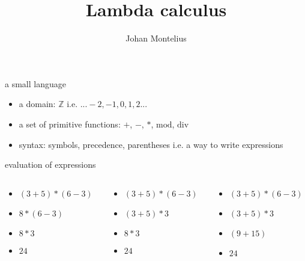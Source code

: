 


\title[ID1019 Lambda calculus]{Lambda calculus}

\author{Johan Montelius}
\date{\semester}



\begin{frame}
\titlepage
\end{frame}


\begin{frame}{a small language}

\pause

\begin{itemize}
 \item a domain: $\mathbb{Z}$ i.e. ${... -2,-1,0,1,2... }$
\pause
 \item a set of primitive functions: $+$, $-$, $*$, $\mathrm{mod}$,  $\mathrm{div}$ 
\pause
 \item syntax: symbols, precedence, parentheses i.e. a way to write expressions
\end{itemize}

\end{frame}


\begin{frame}{evaluation of expressions}
\begin{columns}
 \begin{column}{0.3\linewidth}
  \begin{itemize}
   \pause \item $(3 + 5) * (6 - 3)$
   \pause \item $8 * (6 - 3)$
   \pause \item $8 * 3$
   \pause \item $24$
  \end{itemize}   
 \end{column}
 \begin{column}{0.3\linewidth}
  \begin{itemize}
   \pause \item $(3 + 5) * (6 - 3)$
   \pause \item $(3 + 5) * 3$
   \pause \item $8 * 3$
   \pause \item $24$
  \end{itemize}   
 \end{column}
 \begin{column}{0.3\linewidth}
  \begin{itemize}
   \pause \item $(3 + 5) * (6 - 3)$
   \pause \item $(3 + 5) * 3$
   \pause \item $(9 + 15)$
   \pause \item $24$
  \end{itemize}   
 \end{column}
 \end{columns}
\end{frame}

